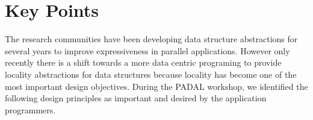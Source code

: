 \section{Key Points}
The research communities have been developing  data structure abstractions for several years to improve expressiveness in
 parallel applications. However only recently there is a shift towards a more data centric programing to provide locality abstractions for data structures because locality has become one of the most important design objectives. During the PADAL workshop, we identified the following design principles as important and desired by the application programmers. 

%

